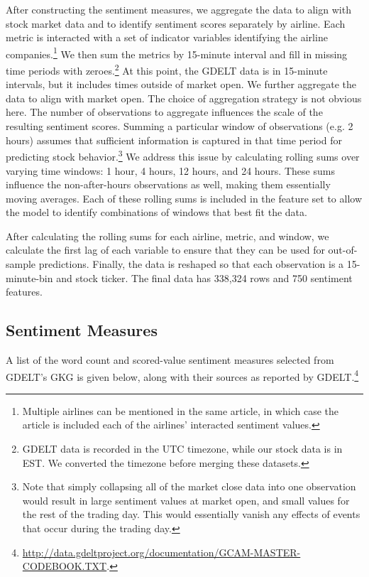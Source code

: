 \documentclass[12pt]{article}
\begin{document}
After constructing the sentiment measures, we aggregate the data to align with stock market data and to identify sentiment scores separately by airline. Each metric is interacted with a set of indicator variables identifying the airline companies.\footnote{Multiple airlines can be mentioned in the same article, in which case the article is included each of the airlines' interacted sentiment values.} We then sum the metrics by 15-minute interval and fill in missing time periods with zeroes.\footnote{GDELT data is recorded in the UTC timezone, while our stock data is in EST. We converted the timezone before merging these datasets.} At this point, the GDELT data is in 15-minute intervals, but it includes times outside of market open. We further aggregate the data to align with market open. The choice of aggregation strategy is not obvious here. The number of observations to aggregate influences the scale of the resulting sentiment scores. Summing a particular window of observations (e.g. 2 hours) assumes that sufficient information is captured in that time period for predicting stock behavior.\footnote{Note that simply collapsing all of the market close data into one observation would result in large sentiment values at market open, and small values for the rest of the trading day. This would essentially vanish any effects of events that occur during the trading day.} We address this issue by calculating rolling sums over varying time windows: 1 hour, 4 hours, 12 hours, and 24 hours. These sums influence the non-after-hours observations as well, making them essentially moving averages. Each of these rolling sums is included in the feature set to allow the model to identify combinations of windows that best fit the data.

After calculating the rolling sums for each airline, metric, and window, we calculate the first lag of each variable to ensure that they can be used for out-of-sample predictions. Finally, the data is reshaped so that each observation is a 15-minute-bin and stock ticker. The final data has 338,324 rows and 750 sentiment features.

\subsection{Sentiment Measures}
A list of the word count and scored-value sentiment measures selected from GDELT's GKG is given below, along with their sources as reported by GDELT.\footnote{\url{http://data.gdeltproject.org/documentation/GCAM-MASTER-CODEBOOK.TXT}.}
\end{document}
